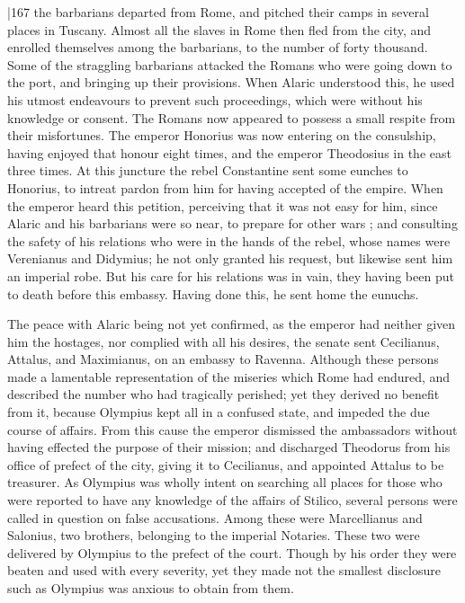 |167 the barbarians departed from Rome, and pitched their camps in several places in Tuscany. Almost all the slaves in Rome then fled from the city, and enrolled themselves among the barbarians, to the number of forty thousand. Some of the straggling barbarians attacked the Romans who were going down to the port, and bringing up their provisions. When Alaric understood this, he used his utmost endeavours to prevent such proceedings, which were without his knowledge or consent. The Romans now appeared to possess a small respite from their misfortunes. The emperor Honorius was now entering on the consulship, having enjoyed that honour eight times, and the emperor Theodosius in the east three times. At this juncture the rebel Constantine sent some eunches to Honorius, to intreat pardon from him for having accepted of the empire. When the emperor heard this petition, perceiving that it was not easy for him, since Alaric and his barbarians were so near, to prepare for other wars ; and consulting the safety of his relations who were in the hands of the rebel, whose names were Verenianus and Didymius; he not only granted his request, but likewise sent him an imperial robe. But his care for his relations was in vain, they having been put to death before this embassy. Having done this, he sent home the eunuchs.

The peace with Alaric being not yet confirmed, as the emperor had neither given him the hostages, nor complied with all his desires, the senate sent Cecilianus, Attalus, and Maximianus, on an embassy to Ravenna. Although these persons made a lamentable representation of the miseries which Rome had endured, and described the number who had tragically perished; yet they derived no benefit from it, because Olympius kept all in a confused state, and impeded the due course of affairs. From this cause the emperor dismissed the ambassadors without having effected the purpose of their mission; and discharged Theodorus from his office of prefect of the city, giving it to Cecilianus, and appointed Attalus to be treasurer. As Olympius was wholly intent on searching all places for those who were reported to have any knowledge of the affairs of Stilico, several persons were called in question on false accusations. Among these were Marcellianus and Salonius, two brothers, belonging to the imperial Notaries. These two were delivered by Olympius to the prefect of the court. Though by his order they were beaten and used with every severity, yet they made not the smallest disclosure such as Olympius was anxious to obtain from them.

